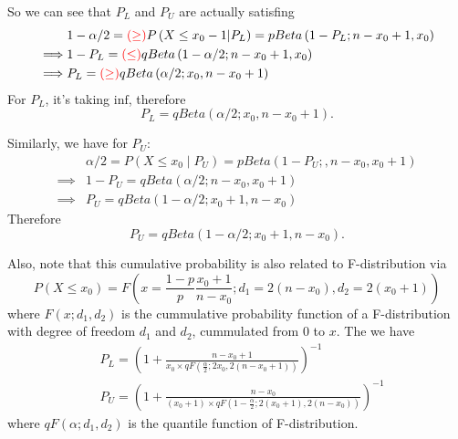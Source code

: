 \documentclass[a4paper,12pt]{article}
\begin{document}
So we can see that $P_L$ and $P_U$ are actually satisfing
\[
  \begin{aligned}
    & 1 - \alpha / 2
    ={\color{red}(\geq)}
    P\left(X \leq x_0 - 1\middle| P_L\right)
    = pBeta\left(1 - P_L; n - x_0 + 1, x_0\right)\\
    \implies & 1 - P_L = {\color{red}(\leq)} qBeta\left(1 - \alpha / 2; n - x_0 + 1 ,x_0\right)    \\
    \implies & P_L ={\color{red}(\geq)} qBeta\left(\alpha / 2; x_0, n - x_0 + 1\right) 
  \end{aligned}
\]
For $P_L$, it's taking $\mathrm{inf}$, therefore
\begin{equation}
  \label{eq:qbeta_pl}
  P_L = qBeta\left(\alpha / 2; x_0, n - x_0 + 1\right)
  .
\end{equation}

Similarly, we have for $P_U$:
\[
  \begin{aligned}
    &\alpha / 2 = P\left(X \leq x_0\middle| P_U\right)
    = pBeta\left(1 - P_U;, n - x_0, x_0 + 1\right)    \\
    \implies & 1 - P_U = qBeta\left(\alpha / 2; n - x_0, x_0 + 1\right)    \\
    \implies & P_U = qBeta\left(1 - \alpha / 2; x_0 + 1, n - x_0\right)
  \end{aligned}
\]
Therefore
\begin{equation}
  \label{eq:qbeta_pu}
  P_U = qBeta\left(1 - \alpha / 2; x_0 + 1, n - x_0\right)
  .
\end{equation}

Also, note that this cumulative probability is also related to F-distribution via
\[
  P\left(X\leq x_0\right) = F\left(
    x = \frac{1 - p}{p}\frac{x_0 + 1}{n - x_0};
    d_1 = 2\left(n - x_0\right),
    d_2 = 2\left(x_0 + 1\right)
  \right)
\]
where $F\left(x;d_1, d_2\right)$ is the cummulative probability function of a F-distribution with degree of freedom $d_1$ and $d_2$, cummulated from 0 to $x$. The we have
\begin{equation}
  \label{eq:qf_p}
  \begin{aligned}
    & P_L = \left(
      1 + \frac{n - x_0 + 1}{
        x_0 \times qF\left(\frac{\alpha}{2}; 2x_0, 2\left(n - x_0 + 1\right)\right)
      }
    \right)^{-1}    \\
    & P_U = \left(
      1 + \frac{n - x_0}{
        \left(x_0 + 1\right) \times
        qF\left(1 - \frac{\alpha}{2}; 2\left(x_0 + 1\right), 2\left(n - x_0\right)\right)
      }
    \right)^{-1}
  \end{aligned}
\end{equation}
where $qF\left(\alpha; d_1, d_2\right)$ is the quantile function of F-distribution.
\end{document}
